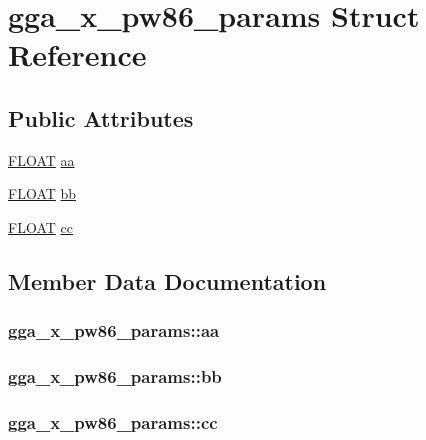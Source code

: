 \hypertarget{structgga__x__pw86__params}{\section{gga\-\_\-x\-\_\-pw86\-\_\-params Struct Reference}
\label{structgga__x__pw86__params}
}
\subsection*{Public Attributes}
\begin{DoxyCompactItemize}
\item 
\hyperlink{src_2xc__config_8h_ae8690abbffa85934d64d545920e2b108}{F\-L\-O\-A\-T} \hyperlink{structgga__x__pw86__params_a04c6cc4cef20dbe4ca0411367bb22760}{aa}
\item 
\hyperlink{src_2xc__config_8h_ae8690abbffa85934d64d545920e2b108}{F\-L\-O\-A\-T} \hyperlink{structgga__x__pw86__params_a44fa617355516f26688c028e17261a42}{bb}
\item 
\hyperlink{src_2xc__config_8h_ae8690abbffa85934d64d545920e2b108}{F\-L\-O\-A\-T} \hyperlink{structgga__x__pw86__params_ac6f2aaf285fd51977376876c367c0f9a}{cc}
\end{DoxyCompactItemize}


\subsection{Member Data Documentation}
\hypertarget{structgga__x__pw86__params_a04c6cc4cef20dbe4ca0411367bb22760}{
\subsubsection[{aa}]{ gga\-\_\-x\-\_\-pw86\-\_\-params\-::aa}}\label{structgga__x__pw86__params_a04c6cc4cef20dbe4ca0411367bb22760}
\hypertarget{structgga__x__pw86__params_a44fa617355516f26688c028e17261a42}{
\subsubsection[{bb}]{ gga\-\_\-x\-\_\-pw86\-\_\-params\-::bb}}\label{structgga__x__pw86__params_a44fa617355516f26688c028e17261a42}
\hypertarget{structgga__x__pw86__params_ac6f2aaf285fd51977376876c367c0f9a}{
\subsubsection[{cc}]{ gga\-\_\-x\-\_\-pw86\-\_\-params\-::cc}}\label{structgga__x__pw86__params_ac6f2aaf285fd51977376876c367c0f9a}


